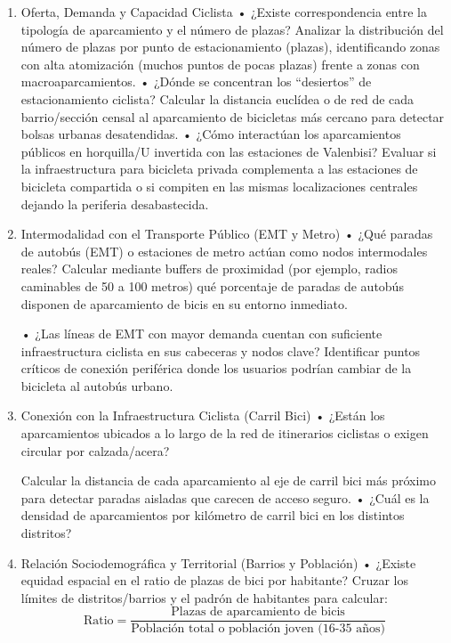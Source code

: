 \documentclass[notspecified,article,submit,moreauthors,pdftex]{Definitions/mdpi}
\begin{document}
\begin{enumerate}
\def\labelenumi{\arabic{enumi}.}
\item
  Oferta, Demanda y Capacidad Ciclista • ¿Existe correspondencia entre
  la tipología de aparcamiento y el número de plazas? Analizar la
  distribución del número de plazas por punto de estacionamiento
  (plazas), identificando zonas con alta atomización (muchos puntos de
  pocas plazas) frente a zonas con macroaparcamientos. • ¿Dónde se
  concentran los ``desiertos'' de estacionamiento ciclista? Calcular la
  distancia euclídea o de red de cada barrio/sección censal al
  aparcamiento de bicicletas más cercano para detectar bolsas urbanas
  desatendidas. • ¿Cómo interactúan los aparcamientos públicos en
  horquilla/U invertida con las estaciones de Valenbisi? Evaluar si la
  infraestructura para bicicleta privada complementa a las estaciones de
  bicicleta compartida o si compiten en las mismas localizaciones
  centrales dejando la periferia desabastecida.
\item
  Intermodalidad con el Transporte Público (EMT y Metro) • ¿Qué paradas
  de autobús (EMT) o estaciones de metro actúan como nodos intermodales
  reales? Calcular mediante buffers de proximidad (por ejemplo, radios
  caminables de 50 a 100 metros) qué porcentaje de paradas de autobús
  disponen de aparcamiento de bicis en su entorno inmediato.

  • ¿Las líneas de EMT con mayor demanda cuentan con suficiente
  infraestructura ciclista en sus cabeceras y nodos clave? Identificar
  puntos críticos de conexión periférica donde los usuarios podrían
  cambiar de la bicicleta al autobús urbano.
\item
  Conexión con la Infraestructura Ciclista (Carril Bici) • ¿Están los
  aparcamientos ubicados a lo largo de la red de itinerarios ciclistas o
  exigen circular por calzada/acera?

  Calcular la distancia de cada aparcamiento al eje de carril bici más
  próximo para detectar paradas aisladas que carecen de acceso seguro. •
  ¿Cuál es la densidad de aparcamientos por kilómetro de carril bici en
  los distintos distritos?
\item
  Relación Sociodemográfica y Territorial (Barrios y Población) •
  ¿Existe equidad espacial en el ratio de plazas de bici por habitante?
  Cruzar los límites de distritos/barrios y el padrón de habitantes para
  calcular:
  \[\text{Ratio} = \frac{\text{Plazas de aparcamiento de bicis}}{\text{Población total o población joven (16-35 años)}}\]


\end{enumerate}
\end{document}
